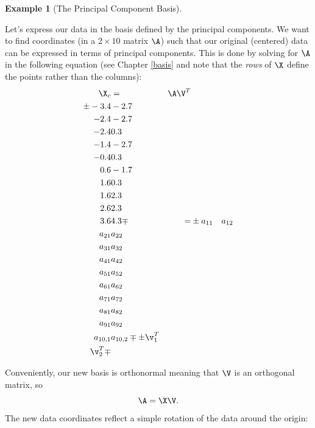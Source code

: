 \documentclass[
]{article}
\theoremstyle{definition}
\theoremstyle{definition}
\newtheorem{example}{Example}[section]
\theoremstyle{definition}
\theoremstyle{definition}
\theoremstyle{remark}
\begin{document}
\begin{example}[The Principal Component Basis]
\protect\hypertarget{exm:pcabasis}{}\label{exm:pcabasis}

Let's express our data in the basis defined by the principal components. We want to find coordinates (in a \(2\times 10\) matrix \(\A\)) such that our original (centered) data can be expressed in terms of principal components. This is done by solving for \(\A\) in the following equation (see Chapter \ref{basis} and note that the \emph{rows} of \(\X\) define the points rather than the columns):
\begin{eqnarray}
 \X_c &=& \A \V^T \\
 \pm -3.4&-2.7\\-2.4&-2.7\\-2.4& 0.3\\-1.4&-2.7\\ -0.4&  0.3\\0.6&-1.7\\1.6& 0.3\\1.6& 2.3\\2.6& 2.3\\3.6&  4.3 \mp &=&  \pm a_{11} & a_{12} \\ a_{21} & a_{22} \\ a_{31} & a_{32}\\ a_{41} & a_{42}\\ a_{51} & a_{52}\\ a_{61} & a_{62}\\ a_{71} & a_{72}\\ a_{81} & a_{82}\\ a_{91} & a_{92}\\ a_{10,1} & a_{10,2} \mp \pm \v_1^T \\ \v_2^T \mp
\end{eqnarray}

Conveniently, our new basis is orthonormal meaning that \(\V\) is an orthogonal matrix, so
\[\A=\X\V .\]
The new data coordinates reflect a simple rotation of the data around the origin:


\end{example}
\end{document}
